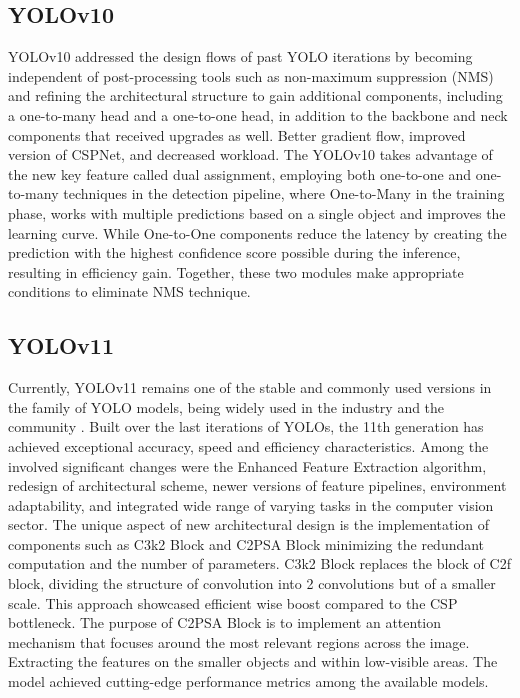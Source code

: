 \begin{multicols}{2}
\subsection{YOLOv10}
YOLOv10 addressed the design flows of past YOLO iterations by becoming independent of post-processing tools such as non-maximum suppression (NMS) and refining the architectural structure to gain additional components, including a one-to-many head and a one-to-one head, in addition to the backbone and neck components that received upgrades as well. Better gradient flow, improved version of CSPNet, and decreased workload. The YOLOv10 takes advantage of the new key feature called dual assignment, employing both one-to-one and one-to-many techniques in the detection pipeline, where One-to-Many in the training phase, works with multiple predictions based on a single object and improves the learning curve. While One-to-One components reduce the latency by creating the prediction with the highest confidence score possible during the inference, resulting in efficiency gain. Together, these two modules make appropriate conditions to eliminate NMS technique.

\subsection{YOLOv11}
Currently, YOLOv11 remains one of the stable and commonly used versions in the family of YOLO models, being widely used in the industry and the community \citep{Rao2024}. Built over the last iterations of YOLOs, the 11th generation has achieved exceptional accuracy, speed and efficiency characteristics. Among the involved significant changes were the Enhanced Feature Extraction algorithm, redesign of architectural scheme, newer versions of feature pipelines, environment adaptability, and integrated wide range of varying tasks in the computer vision sector. The unique aspect of new architectural design is the implementation of components such as C3k2 Block and C2PSA Block minimizing the redundant computation and the number of parameters. C3k2 Block replaces the block of C2f block, dividing the structure of convolution into 2 convolutions but of a smaller scale. This approach showcased efficient wise boost compared to the CSP bottleneck. The purpose of C2PSA Block is to implement an attention mechanism that focuses around the most relevant regions across the image. Extracting the features on the smaller objects and within low-visible areas.
The model achieved cutting-edge performance metrics among the available models. 


\end{multicols}
